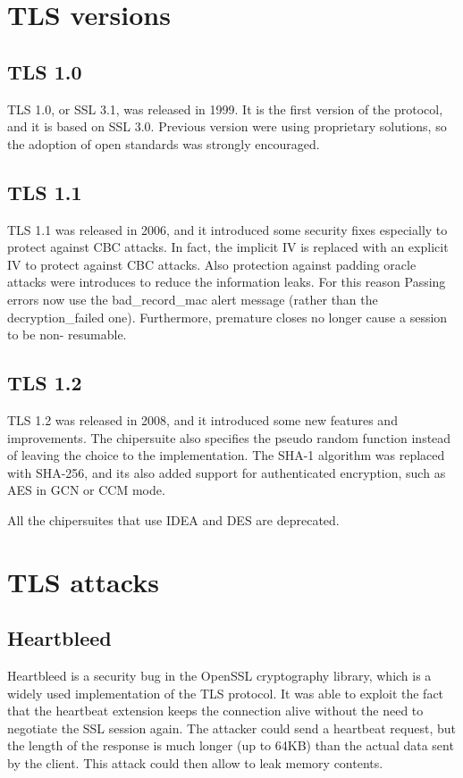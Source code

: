 \section{TLS versions}
\subsection{TLS 1.0}
TLS 1.0, or SSL 3.1, was released in 1999. It is the first version of
the protocol, and it is based on SSL 3.0. Previous version were using
proprietary solutions, so the adoption of open standards was strongly
encouraged.

\subsection{TLS 1.1}
TLS 1.1 was released in 2006, and it introduced some security fixes
especially to protect against CBC attacks. In fact, the implicit
IV is replaced with an explicit IV to protect against CBC attacks.
Also protection against padding oracle attacks were introduces to
reduce the information leaks. For this reason Passing errors now use
the bad\_record\_mac alert message (rather than the decryption\_failed
one). Furthermore, premature closes no longer cause a session to be non-
resumable.

\subsection{TLS 1.2}
TLS 1.2 was released in 2008, and it introduced some new features and 
improvements. The chipersuite also specifies the pseudo random
function instead of leaving the choice to the implementation. The
SHA-1 algorithm was replaced with SHA-256, and its also added support
for authenticated encryption, such as AES in GCN or CCM mode.

All the chipersuites that use IDEA and DES are deprecated.

\section{TLS attacks}
\subsection{Heartbleed}
Heartbleed is a security bug in the OpenSSL cryptography library,
which is a widely used implementation of the TLS protocol. It was able
to exploit the fact that the heartbeat extension keeps the connection
alive without the need to negotiate the SSL session again. The
attacker could send a heartbeat request, but the length of the 
response is much longer (up to 64KB) than the actual data sent by the
client. This attack could then allow to leak memory contents.

